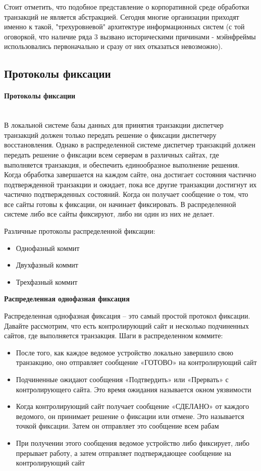 Стоит отметить, что подобное представление о корпоративной среде обработки транзакций не является абстракцией.
Сегодня многие организации приходят именно к такой, "трехуровневой"  архитектуре информационных
систем (с той оговоркой, что наличие ряда 3 вызвано историческими причинами - мэйнфреймы использовались
первоначально и сразу от них отказаться невозможно).

\subsection{Протоколы фиксации}
\paragraph{Протоколы фиксации}~\\

В локальной системе базы данных для принятия транзакции диспетчер транзакций должен только передать решение
о фиксации диспетчеру восстановления. Однако в распределенной системе диспетчер транзакций должен передать
решение о фиксации всем серверам в различных сайтах, где выполняется транзакция, и обеспечить
единообразное выполнение решения. Когда обработка завершается на каждом сайте, она достигает состояния
частично подтвержденной транзакции и ожидает, пока все другие транзакции достигнут их частично подтвержденных состояний.
Когда он получает сообщение о том, что все сайты готовы к фиксации, он начинает фиксировать.
В распределенной системе либо все сайты фиксируют, либо ни один из них не делает.

Различные протоколы распределенной фиксации:
\begin{itemize}
    \item Однофазный коммит
    \item Двухфазный коммит
    \item Трехфазный коммит
\end{itemize}

\bigbreak
\textbf{Распределенная однофазная фиксация}

Распределенная однофазная фиксация – это самый простой протокол фиксации. Давайте рассмотрим, что есть
контролирующий сайт и несколько подчиненных сайтов, где выполняется транзакция. Шаги в распределенном коммите:
\begin{itemize}
    \item После того, как каждое ведомое устройство локально завершило свою транзакцию, оно
    отправляет сообщение «ГОТОВО» на контролирующий сайт
    \item Подчиненные ожидают сообщения «Подтвердить» или «Прервать» с контролирующего сайта.
    Это время ожидания называется окном уязвимости
    \item Когда контролирующий сайт получает сообщение «СДЕЛАНО» от каждого ведомого, он принимает решение
    о фиксации или отмене. Это называется точкой фиксации. Затем он отправляет это сообщение всем рабам
    \item При получении этого сообщения ведомое устройство либо фиксирует, либо прерывает работу,
    а затем отправляет подтверждающее сообщение на контролирующий сайт
\end{itemize}

